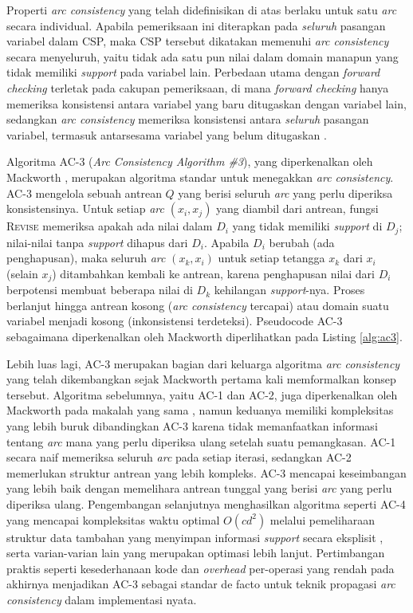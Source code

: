 Properti \textit{arc consistency} yang telah didefinisikan di atas berlaku untuk satu \textit{arc} secara individual. Apabila pemeriksaan ini diterapkan pada \textit{seluruh} pasangan variabel dalam CSP, maka CSP tersebut dikatakan memenuhi \textit{arc consistency} secara menyeluruh, yaitu tidak ada satu pun nilai dalam domain manapun yang tidak memiliki \textit{support} pada variabel lain. Perbedaan utama dengan \textit{forward checking} terletak pada cakupan pemeriksaan, di mana \textit{forward checking} hanya memeriksa konsistensi antara variabel yang baru ditugaskan dengan variabel lain, sedangkan \textit{arc consistency} memeriksa konsistensi antara \textit{seluruh} pasangan variabel, termasuk antarsesama variabel yang belum ditugaskan \cite{russell2020artificial}.

Algoritma AC-3 (\textit{Arc Consistency Algorithm \#3}), yang diperkenalkan oleh Mackworth \cite{mackworth1977consistency}, merupakan algoritma standar untuk menegakkan \textit{arc consistency}. AC-3 mengelola sebuah antrean $Q$ yang berisi seluruh \textit{arc} yang perlu diperiksa konsistensinya. Untuk setiap \textit{arc} $(x_i, x_j)$ yang diambil dari antrean, fungsi \textsc{Revise} memeriksa apakah ada nilai dalam $D_i$ yang tidak memiliki \textit{support} di $D_j$; nilai-nilai tanpa \textit{support} dihapus dari $D_i$. Apabila $D_i$ berubah (ada penghapusan), maka seluruh \textit{arc} $(x_k, x_i)$ untuk setiap tetangga $x_k$ dari $x_i$ (selain $x_j$) ditambahkan kembali ke antrean, karena penghapusan nilai dari $D_i$ berpotensi membuat beberapa nilai di $D_k$ kehilangan \textit{support}-nya. Proses berlanjut hingga antrean kosong (\textit{arc consistency} tercapai) atau domain suatu variabel menjadi kosong (inkonsistensi terdeteksi). Pseudocode AC-3 sebagaimana diperkenalkan oleh Mackworth \cite{mackworth1977consistency} diperlihatkan pada Listing \ref{alg:ac3}.

Lebih luas lagi, AC-3 merupakan bagian dari keluarga algoritma \textit{arc consistency} yang telah dikembangkan sejak Mackworth pertama kali memformalkan konsep tersebut. Algoritma sebelumnya, yaitu AC-1 dan AC-2, juga diperkenalkan oleh Mackworth pada makalah yang sama \cite{mackworth1977consistency}, namun keduanya memiliki kompleksitas yang lebih buruk dibandingkan AC-3 karena tidak memanfaatkan informasi tentang \textit{arc} mana yang perlu diperiksa ulang setelah suatu pemangkasan. AC-1 secara naif memeriksa seluruh \textit{arc} pada setiap iterasi, sedangkan AC-2 memerlukan struktur antrean yang lebih kompleks. AC-3 mencapai keseimbangan yang lebih baik dengan memelihara antrean tunggal yang berisi \textit{arc} yang perlu diperiksa ulang. Pengembangan selanjutnya menghasilkan algoritma seperti AC-4 yang mencapai kompleksitas waktu optimal $O(cd^2)$ melalui pemeliharaan struktur data tambahan yang menyimpan informasi \textit{support} secara eksplisit \cite{mohr1986arc}, serta varian-varian lain yang merupakan optimasi lebih lanjut. Pertimbangan praktis seperti kesederhanaan kode dan \textit{overhead} per-operasi yang rendah pada akhirnya menjadikan AC-3 sebagai standar de facto untuk teknik propagasi \textit{arc consistency} dalam implementasi nyata.

